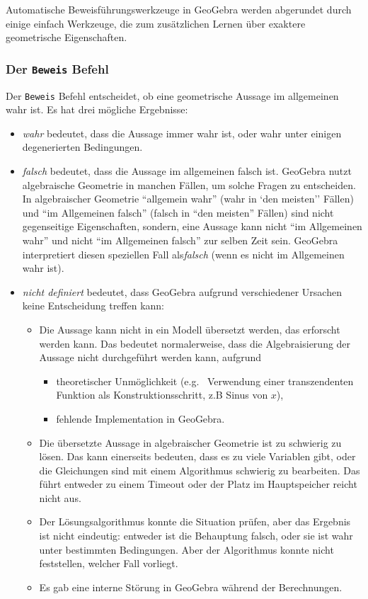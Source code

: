 \documentclass{article}
\begin{document}
Automatische Beweisführungswerkzeuge in GeoGebra werden abgerundet durch einige einfach Werkzeuge, die zum zusätzlichen Lernen über exaktere geometrische Eigenschaften.

\subsubsection{Der \texttt{Beweis} Befehl}
Der \texttt{Beweis} Befehl entscheidet, ob eine geometrische Aussage im allgemeinen wahr ist. Es hat drei mögliche Ergebnisse:
\begin{itemize}
    \item \textit{wahr} bedeutet, dass die Aussage immer wahr ist, oder wahr unter einigen degenerierten Bedingungen.
    \item \textit{falsch} bedeutet, dass die Aussage im allgemeinen falsch ist. GeoGebra nutzt algebraische Geometrie in manchen Fällen, um solche Fragen zu entscheiden. In algebraischer Geometrie ``allgemein wahr'' (wahr in `den meisten'' Fällen) und ``im Allgemeinen falsch'' (falsch in ``den meisten'' Fällen) sind nicht gegenseitige Eigenschaften, sondern, eine Aussage kann nicht ``im Allgemeinen wahr'' und nicht ``im Allgemeinen falsch'' zur selben Zeit sein. GeoGebra interpretiert diesen speziellen Fall als\textit{falsch} (wenn es nicht im Allgemeinen wahr ist).
    \item \textit{nicht definiert} bedeutet, dass GeoGebra aufgrund verschiedener Ursachen keine Entscheidung treffen kann:
    \begin{itemize}
        \item Die Aussage kann nicht in ein Modell übersetzt werden, das erforscht werden kann. Das bedeutet normalerweise, dass die Algebraisierung der Aussage nicht durchgeführt werden kann, aufgrund
        \begin{itemize}
            \item theoretischer Unmöglichkeit (e.g.~ Verwendung einer transzendenten Funktion als Konstruktionsschritt, z.B Sinus von $x$),
            \item fehlende Implementation in GeoGebra.
        \end{itemize}
        \item Die übersetzte Aussage in algebraischer Geometrie ist zu schwierig zu lösen. Das kann einerseits bedeuten, dass es zu viele Variablen gibt, oder die Gleichungen sind mit einem Algorithmus schwierig zu bearbeiten. Das führt entweder zu einem Timeout oder der Platz im Hauptspeicher reicht nicht aus.
        \item Der Lösungsalgorithmus konnte die Situation prüfen, aber das Ergebnis ist nicht eindeutig: entweder ist die Behauptung falsch, oder sie ist wahr unter bestimmten Bedingungen. Aber der Algorithmus konnte nicht feststellen, welcher Fall vorliegt.
        \item Es gab eine interne Störung in GeoGebra während der Berechnungen.
    \end{itemize}
\end{itemize}
\end{document}
